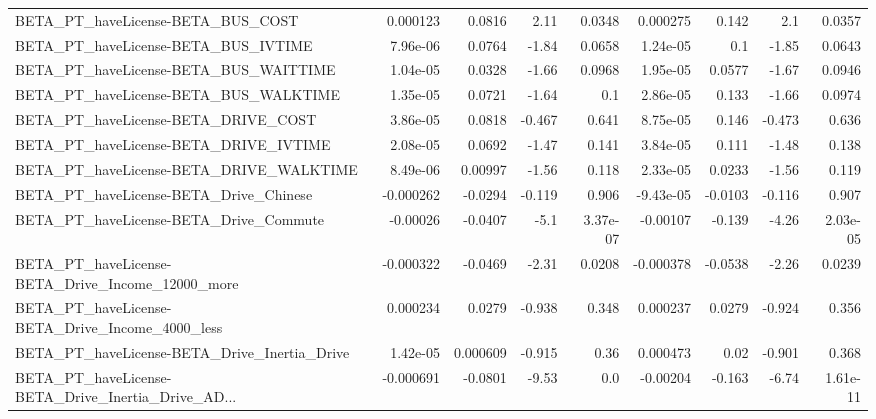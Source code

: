 \begin{tabular}{lrrrrrrrr}
BETA\_PT\_haveLicense-BETA\_BUS\_COST                  &    0.000123 &       0.0816 &     2.11 &   0.0348 &   0.000275 &       0.142 &          2.1 &        0.0357 \\
BETA\_PT\_haveLicense-BETA\_BUS\_IVTIME                &    7.96e-06 &       0.0764 &    -1.84 &   0.0658 &   1.24e-05 &         0.1 &        -1.85 &        0.0643 \\
BETA\_PT\_haveLicense-BETA\_BUS\_WAITTIME              &    1.04e-05 &       0.0328 &    -1.66 &   0.0968 &   1.95e-05 &      0.0577 &        -1.67 &        0.0946 \\
BETA\_PT\_haveLicense-BETA\_BUS\_WALKTIME              &    1.35e-05 &       0.0721 &    -1.64 &      0.1 &   2.86e-05 &       0.133 &        -1.66 &        0.0974 \\
BETA\_PT\_haveLicense-BETA\_DRIVE\_COST                &    3.86e-05 &       0.0818 &   -0.467 &    0.641 &   8.75e-05 &       0.146 &       -0.473 &         0.636 \\
BETA\_PT\_haveLicense-BETA\_DRIVE\_IVTIME              &    2.08e-05 &       0.0692 &    -1.47 &    0.141 &   3.84e-05 &       0.111 &        -1.48 &         0.138 \\
BETA\_PT\_haveLicense-BETA\_DRIVE\_WALKTIME            &    8.49e-06 &      0.00997 &    -1.56 &    0.118 &   2.33e-05 &      0.0233 &        -1.56 &         0.119 \\
BETA\_PT\_haveLicense-BETA\_Drive\_Chinese             &   -0.000262 &      -0.0294 &   -0.119 &    0.906 &  -9.43e-05 &     -0.0103 &       -0.116 &         0.907 \\
BETA\_PT\_haveLicense-BETA\_Drive\_Commute             &    -0.00026 &      -0.0407 &     -5.1 & 3.37e-07 &   -0.00107 &      -0.139 &        -4.26 &      2.03e-05 \\
BETA\_PT\_haveLicense-BETA\_Drive\_Income\_12000\_more   &   -0.000322 &      -0.0469 &    -2.31 &   0.0208 &  -0.000378 &     -0.0538 &        -2.26 &        0.0239 \\
BETA\_PT\_haveLicense-BETA\_Drive\_Income\_4000\_less    &    0.000234 &       0.0279 &   -0.938 &    0.348 &   0.000237 &      0.0279 &       -0.924 &         0.356 \\
BETA\_PT\_haveLicense-BETA\_Drive\_Inertia\_Drive       &    1.42e-05 &     0.000609 &   -0.915 &     0.36 &   0.000473 &        0.02 &       -0.901 &         0.368 \\
BETA\_PT\_haveLicense-BETA\_Drive\_Inertia\_Drive\_AD... &   -0.000691 &      -0.0801 &    -9.53 &      0.0 &   -0.00204 &      -0.163 &        -6.74 &      1.61e-11 \\

\end{tabular}
